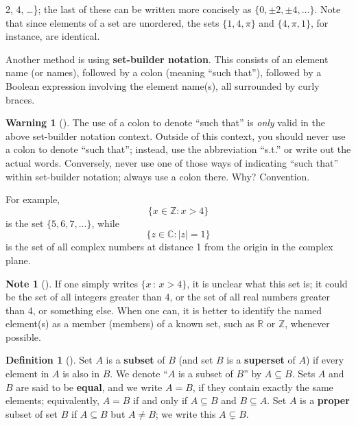 \documentclass[10pt,]{book}
\newcommand{\terminology}[1]{\textbf{#1}}
\theoremstyle{plain}
\theoremstyle{definition}
\newtheorem{definition}[theorem]{Definition}
\theoremstyle{definition}
\newtheorem{note}[theorem]{Note}
\newtheorem{warning}[theorem]{Warning}
\theoremstyle{definition}
\theoremstyle{definition}
\numberwithin{equation}{section}
\def\Z{\mathbb{Z}}
\def\R{\mathbb{R}}
\def\C{\mathbb{C}}
\begin{document}
2, 4, \ldots\}\); the last of these can be written more concisely as \(\{0,\pm 2, \pm 4,\ldots\}\). Note that since elements of a set are unordered, the sets \(\{1,4,\pi\}\) and \(\{4,\pi, 1\}\), for instance, are identical.%
\par
Another method is using \terminology{set-builder notation}. This consists of an element name (or names), followed by a colon (meaning ``such that''), followed by a Boolean expression involving the element name(s), all surrounded by curly braces.%
\begin{warning}[]\label{warning-1}
The use of a colon to denote ``such that'' is \emph{only} valid in the above set-builder notation context.  Outside of this context, you should never use a colon to denote ``such that''; instead, use the abbreviation ``s.t.'' or write out the actual words.   Conversely, never use one of those ways of indicating ``such that'' within set-builder notation; always use a colon there.  Why?  Convention.%
\end{warning}
For example,%
\begin{equation*}
\{x\in \Z : x > 4\} 
\end{equation*}
is the set \(\{5, 6, 7, \ldots\}\), while%
\begin{equation*}
\{z\in \C : |z|=1\}
\end{equation*}
is the set of all complex numbers at distance 1 from the origin in the complex plane.%
\begin{note}[]\label{note-2}
If one simply writes \(\{x\,:\,x>4\}\), it is unclear what this set is; it could be the set of all integers greater than 4, or the set of all real numbers greater than 4, or something else. When one can, it is better to identify the named element(s) as a member (members) of a known set, such as \(\R\) or \(\Z\), whenever possible.%
\end{note}
\begin{definition}[{}]\label{definition-4}
\label{notation-14}
\label{notation-15}
Set \(A\) is a \terminology{subset} of \(B\) (and set \(B\) is a \terminology{superset} of \(A\)) if every element in \(A\) is also in \(B\). We denote ``\(A\) is a subset of \(B\)'' by \(A\subseteq B\). Sets \(A\) and \(B\) are said to be \terminology{equal}, and we write \(A=B\), if they contain exactly the same elements; equivalently, \(A=B\) if and only if \(A \subseteq B\) and \(B\subseteq A\). Set \(A\) is a \terminology{proper} subset of set \(B\) if \(A\subseteq B\) but \(A\neq B\); we write this \(A\subsetneq B\).%
\end{definition}
\end{document}
